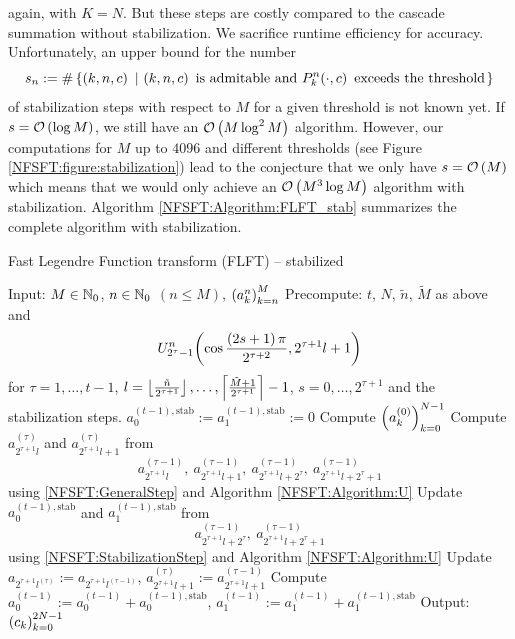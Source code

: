 again, with $K = N$. But these steps are costly compared to the cascade summation without stabilization. We sacrifice runtime efficiency 
for accuracy. Unfortunately, an upper bound for the number 
\[
  s_{n} := \#\left\{\left(k,n,c\right)\ \left|\ \left(k,n,c\right) \text{ is admitable and } P_{k}^n{\hspace{-0.4ex}}\left(\cdot,c\right) \text{ exceeds the threshold}\right.\right\rbrace
\] 
of stabilization steps with respect to $M$ for a given threshold is not known yet. If $s = \mathcal{O}\left(\log M\right)$, 
we still have an $\mathcal{O}\left(M \log^2 M\right)$ algorithm. However, our computations for $M$ up to $4096$ and different 
thresholds (see Figure \ref{NFSFT:figure:stabilization}) lead to the conjecture  
that we only have $s = \mathcal{O}\left(M\right)$ which means that we would only achieve an $\mathcal{O}\left(M^3 \log M\right)$ algorithm with stabilization. 
Algorithm \ref{NFSFT:Algorithm:FLFT_stab} summarizes the complete algorithm with stabilization.
\begin{algorithm}[tb]
  \caption{Fast Legendre Function transform (FLFT) -- stabilized}
  \label{NFSFT:Algorithm:FLFT_stab}    
  \begin{algorithmic}
    \STATE Input:  $M \in \mathbb{N}_{0}$, $n \in \mathbb{N}_{0}$ $(n \le M)$, $\left(a_k^n\right)_{k=n}^{M}$
    \STATE Precompute: $t$, $N$, $\tilde{n}$, $\tilde{M}$ as above and \[U_{2^{\tau}-1}^{n}{\hspace{-0.4ex}}\left(\cos \frac{\left(2s+1\right)\pi}{2^{\tau+2}}, 2^{\tau+1}l+1\right)\] 
    \STATE {} for $\tau = 1,\ldots,t-1$, $l = \left\lfloor\frac{\tilde{n}}{2^{\tau+1}}\right\rfloor,\ldots,\left\lceil\frac{\tilde{M}+1}{2^{\tau+1}}\right\rceil-1$, 
    \STATE {} $s = 0,\ldots,2^{\tau+1}$ and the stabilization steps.
    \STATE $a_{0}^{(t-1),\text{stab}} := a_{1}^{(t-1),\text{stab}} := 0$
    \STATE Compute $\left(a_{k}^{(0)}\right)_{k=0}^{N-1}$ 
          \STATE Compute $a_{2^{\tau+1}l}^{(\tau)}$ and $a_{2^{\tau+1}l+1}^{(\tau)}$ from \[a_{2^{\tau+1}l}^{(\tau-1)},\  
            a_{2^{\tau+1}l+1}^{(\tau-1)},\ a_{2^{\tau+1}l+2^{\tau}}^{(\tau-1)},\ a_{2^{\tau+1}l+2^{\tau}+1}^{(\tau-1)}\] using 
            \eqref{NFSFT:GeneralStep} and Algorithm \ref{NFSFT:Algorithm:U}
        \ELSE
          \STATE Update $a_{0}^{(t-1),\text{stab}}$ and $a_{1}^{(t-1),\text{stab}}$ from
            \[ 
              a_{2^{\tau+1}l+2^{\tau}}^{(\tau-1)},\ a_{2^{\tau+1}l+2^{\tau}+1}^{(\tau-1)}
            \] 
            using \eqref{NFSFT:StabilizationStep} and Algorithm \ref{NFSFT:Algorithm:U}
          \STATE Update $a_{2^{\tau+1}l^{(\tau)}} := a_{2^{\tau+1}l^{(\tau-1)}}$, $a_{2^{\tau+1}l+1}^{(\tau)} := a_{2^{\tau+1}l+1}^{(\tau-1)}$
        \ENDIF
      \ENDFOR
    \ENDFOR
    \STATE Compute $a_{0}^{(t-1)} := a_{0}^{(t-1)} + a_{0}^{(t-1),\text{stab}}$, $a_{1}^{(t-1)} := a_{1}^{(t-1)} + a_{1}^{(t-1),\text{stab}}$
    \STATE Output: $\left(c_{k}\right)_{k=0}^{2N-1}$
\end{algorithmic}
\end{algorithm}

